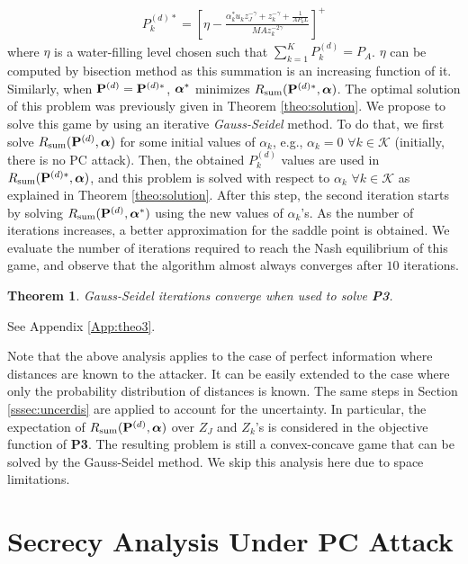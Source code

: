 \documentclass[draftclsnofoot, 12pt, onecolumn, journal]{IEEEtran}
\newcommand{\Pm}{{\bf P}}
\newcommand{\alphav}{\hbox{\boldmath$\alpha$}}
\newtheorem{theorem}{Theorem}
\begin{document}
%
\begin{align}
P_k^{(d)*} = \left[ \eta - \frac{ \alpha_k^* u_k z_J^{-\gamma} + z_k^{-\gamma} + \frac{1}{A P_k L} }{ M A z_k^{-2\gamma} } \right]^+
\end{align}
%
where $\eta$ is a water-filling level chosen such that $\sum_{k=1}^K P_k^{(d)} = P_A$.
$\eta$ can be computed by bisection method as this summation is an increasing function of it.
Similarly, when $\Pm^{(d)} = \Pm^{(d)*}$, $\alphav^*$ minimizes $R_{\text{sum}}(\Pm^{(d)*}, \alphav)$.
The optimal solution of this problem was previously given in Theorem \ref{theo:solution}.
We propose to solve this game by using an iterative \textit{Gauss-Seidel} method.
To do that, we first solve $R_{\text{sum}}(\Pm^{(d)}, \alphav)$ for some initial values of $\alpha_k$, e.g., $\alpha_k = 0 $ $\forall k \in \mathcal{K}$ (initially, there is no PC attack).
Then, the obtained $P_k^{(d)}$ values are used in $R_{\text{sum}}(\Pm^{(d)*}, \alphav)$, and this problem is solved with respect to $\alpha_k$ $\forall k \in \mathcal{K}$ as explained in Theorem \ref{theo:solution}.
After this step, the second iteration starts by solving $R_{\text{sum}}(\Pm^{(d)}, \alphav^*)$ using the new values of $\alpha_k$'s.
As the number of iterations increases, a better approximation for the saddle point is obtained.
We evaluate the number of iterations required to reach the Nash equilibrium of this game, and observe that the algorithm almost always converges after $10$ iterations.
%
\begin{theorem}
Gauss-Seidel iterations converge when used to solve \textbf{P3}.
\end{theorem}
%
\begin{IEEEproof}
See Appendix \ref{App:theo3}.
\end{IEEEproof}
%
Note that the above analysis applies to the case of perfect information where distances are known to the attacker.
It can be easily extended to the case where only the probability distribution of distances is known.
The same steps in Section \ref{sssec:uncerdis} are applied to account for the uncertainty.
In particular, the expectation of $R_{\text{sum}}(\Pm^{(d)}, \alphav)$ over $Z_J$ and $Z_k$'s is considered in the objective function of \textbf{P3}.
The resulting problem is still a convex-concave game that can be solved by the Gauss-Seidel method.
We skip this analysis here due to space limitations.

\section{Secrecy Analysis Under PC Attack}
\label{sec:secrecy}
\end{document}
